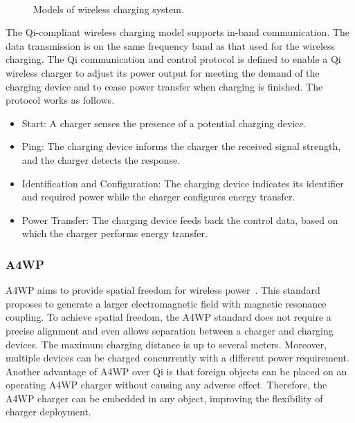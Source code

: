 \documentclass[twocolumn,10pt]{IEEEtran}
\begin{document}
 

\begin{figure} 
\centering
{}  
 \centering
  \centering
  \hspace{3mm}
 \\
\centering
\caption{Models of wireless charging system.} 
\label{alignment_designs}
\end{figure}

The Qi-compliant wireless charging model supports in-band communication. The data transmission is on the same frequency band as that used for the wireless charging. The Qi communication and control protocol is defined to enable a Qi wireless charger to adjust its power output for meeting the demand of the charging device and to cease power transfer when charging is finished. The protocol works as follows.
\begin{itemize}

\item Start: A charger senses the presence of a potential charging device.  

\item Ping: The charging device informs the charger the received signal strength, and the charger detects the response.  

\item Identification and Configuration: The charging device indicates its identifier and required power while the charger configures energy transfer.
 
\item Power Transfer: The charging device feeds back the control data, based on which the charger performs energy transfer. 

\end{itemize}
 
 

\subsubsection{A4WP}

A4WP aims to provide spatial freedom for wireless power~\cite{R.2013Tseng}. This standard proposes to generate a larger electromagnetic field with magnetic resonance coupling. To achieve spatial freedom, the A4WP standard does not require a precise alignment and even allows separation between a charger and charging devices. The maximum charging distance is up to several meters. Moreover, multiple devices can be charged concurrently with a different power requirement. Another advantage of A4WP over Qi is that foreign objects can be placed on an operating A4WP charger without causing any adverse effect. Therefore, the A4WP charger can be embedded in any object, improving the flexibility of charger deployment.
\end{document}
